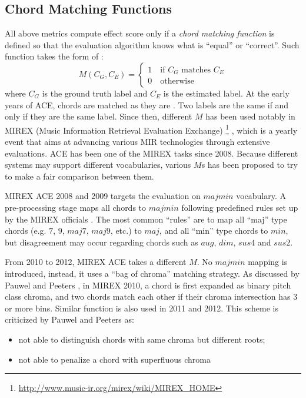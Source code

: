 \subsection{Chord Matching Functions}
All above metrics compute effect score only if a {\it chord matching function} is defined so that the evaluation algorithm knows what is ``equal'' or ``correct''. Such function takes the form of \cite{harte2010towards}:
\begin{equation}
M(C_G,C_E)=
\begin{cases}
1 \quad \text{if $C_G$ matches $C_E$} \\
0 \quad \text{otherwise}
\end{cases}
\end{equation}
where $C_G$ is the ground truth label and $C_E$ is the estimated label. At the early years of ACE, chords are matched as they are \cite{fujishima1999realtime,sheh2003chord,bello2005robust}. Two labels are the same if and only if they are the same label. Since then, different $M$ has been used notably in MIREX (Music Information Retrieval Evaluation Exchange) \footnote{\url{http://www.music-ir.org/mirex/wiki/MIREX\_HOME}} \cite{downie2008music}, which is a yearly event that aims at advancing various MIR technologies through extensive evaluations. ACE has been one of the MIREX tasks since 2008. Because different systems may support different vocabularies, various $M$s has been proposed to try to make a fair comparison between them.

MIREX ACE 2008 and 2009 targets the evaluation on $majmin$ vocabulary. A pre-processing stage maps all chords to $majmin$ following predefined rules set up by the MIREX officials \cite{harte2010towards}. The most common ``rules'' are to map all ``maj'' type chords (e.g. $7$, $9$, $maj7$, $maj9$, etc.) to $maj$, and all ``min'' type chords to $min$, but disagreement may occur regarding chords such as $aug$, $dim$, $sus4$ and $sus2$.

From 2010 to 2012, MIREX ACE takes a different $M$. No $majmin$ mapping is introduced, instead, it uses a ``bag of chroma'' matching strategy. As discussed by Pauwel and Peeters \cite{pauwels2013evaluating}, in MIREX 2010, a chord is first expanded as binary pitch class chroma, and two chords match each other if their chroma intersection has 3 or more bins. Similar function is also used in 2011 and 2012. This scheme is criticized by Pauwel and Peeters \cite{pauwels2013evaluating} as:
\begin{itemize}
\item not able to distinguish chords with same chroma but different roots;
\item not able to penalize a chord with superfluous chroma
\end{itemize}

